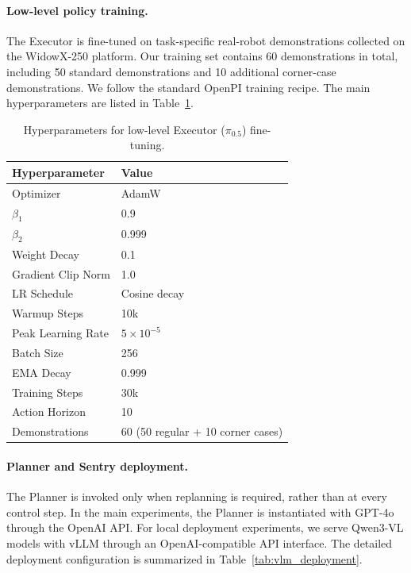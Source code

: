 \paragraph{Low-level policy training.}
The Executor is fine-tuned on task-specific real-robot demonstrations collected on the WidowX-250 platform. Our training set contains 60 demonstrations in total, including 50 standard demonstrations and 10 additional corner-case demonstrations. We follow the standard OpenPI training recipe. The main hyperparameters are listed in Table~\ref{tab:low_level_hyperparams}.

\begin{table}[H]
\centering
\caption{Hyperparameters for low-level Executor ($\pi_{0.5}$) fine-tuning.}
\label{tab:low_level_hyperparams}
\begin{tabular}{ll}
\toprule
\textbf{Hyperparameter} & \textbf{Value} \\
\midrule
Optimizer & AdamW \\
$\beta_1$ & 0.9 \\
$\beta_2$ & 0.999 \\
Weight Decay & 0.1 \\
Gradient Clip Norm & 1.0 \\
LR Schedule & Cosine decay \\
Warmup Steps & 10k \\
Peak Learning Rate & $5 \times 10^{-5}$ \\
Batch Size & 256 \\
EMA Decay & 0.999 \\
Training Steps & 30k \\
Action Horizon & 10 \\
Demonstrations & 60 (50 regular + 10 corner cases) \\
\bottomrule
\end{tabular}
\end{table}

\paragraph{Planner and Sentry deployment.}
The Planner is invoked only when replanning is required, rather than at every control step. In the main experiments, the Planner is instantiated with GPT-4o through the OpenAI API. For local deployment experiments, we serve Qwen3-VL models with vLLM through an OpenAI-compatible API interface. The detailed deployment configuration is summarized in Table~\ref{tab:vlm_deployment}.

